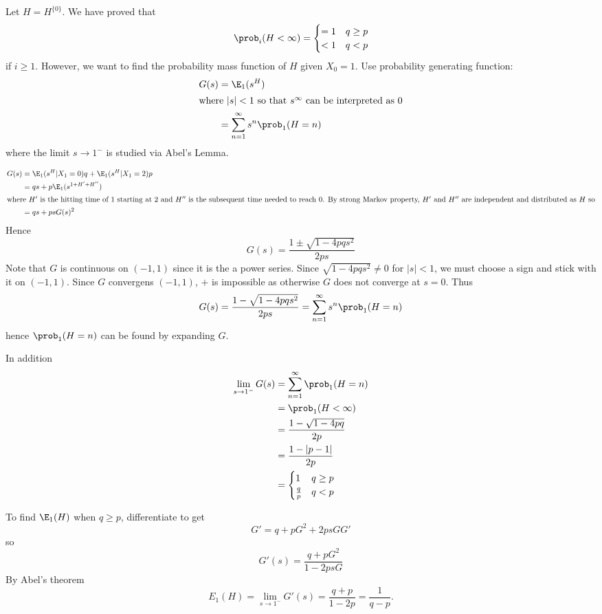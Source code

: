 \documentclass[a4paper]{article}
\begin{document}
\begin{eg}
  Let \(H = H^{\{0\}}\). We have proved that
  \[
    \prob_i(H < \infty) =
    \begin{cases}
      = 1 & q \geq p \\
      < 1 & q < p
    \end{cases}
  \]
  if \(i \geq 1\). However, we want to find the probability mass function of \(H\) given \(X_0 = 1\). Use probability generating function:
  \begin{align*}
    G(s) &= \E_1(s^H) \\
    \intertext{where \(|s| < 1\) so that \(s^\infty\) can be interpreted as \(0\)}
         &= \sum_{n = 1}^{\infty} s^n \prob_1(H = n) \\
  \end{align*}
  where the limit \(s \to 1^-\) is studied via Abel's Lemma.

  \begin{align*}
    G(s) &= \E_1(s^H | X_1 = 0)q + \E_1(s^H | X_1 = 2)p \\
         &= qs + p \E_1(s^{1 + H' + H''}) \\
           \intertext{where \(H'\) is the hitting time of \(1\) starting at \(2\) and \(H''\) is the subsequent time needed to reach \(0\). By strong Markov property, \(H'\) and \(H''\) are independent and distributed as \(H\) so}
         &= qs + ps G(s)^2
  \end{align*}
  Hence
  \[
    G(s) = \frac{1 \pm \sqrt{1 - 4pqs^2}}{2ps}
  \]
  Note that \(G\) is continuous on \((-1, 1)\) since it is the a power series. Since \(\sqrt{1 - 4pqs^2} \neq 0\) for \(|s| < 1\), we must choose a sign and stick with it on \((-1, 1)\). Since \(G\) convergens \((-1, 1)\), \(+\) is impossible as otherwise \(G\) does not converge at \(s = 0\). Thus
  \[
    G(s) = \frac{1 - \sqrt{1 - 4pqs^2}}{2ps} = \sum_{n = 1}^{\infty} s^n \prob_1(H = n)
  \]
  hence \(\prob_1(H = n) \) can be found by expanding \(G\).

  In addition
  \begin{align*}
    \lim_{s \to 1^-} G(s) &= \sum_{n = 1 }^{\infty} \prob_1(H = n) \\
                          &= \prob_1(H < \infty) \\
                          &= \frac{1 - \sqrt{1- 4pq}}{2p} \\
                          &= \frac{1 - |p - 1|}{2p} \\
                          &=
                            \begin{cases}
                              1 & q \geq p \\
                              \frac{q}{p} & q < p
                            \end{cases}
  \end{align*}

  To find \(\E_1(H)\) when \(q \geq p\), differentiate to get
  \[
    G' = q + p G^2 + 2ps G G'
  \]
  so
  \[
    G'(s) = \frac{q + pG^2}{1 - 2psG}
  \]
  By  Abel's theorem
  \[
    E_1(H) = \lim_{s \to 1^-} G'(s) = \frac{q + p}{1 - 2p} = \frac{1}{q - p}.
  \]
\end{eg}
\end{document}
